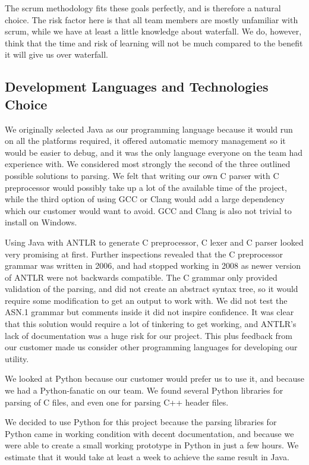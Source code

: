 The scrum methodology fits these goals perfectly, and is therefore a natural
choice. The risk factor here is that all team members are mostly unfamiliar
with scrum, while we have at least a little knowledge about waterfall. We do,
however, think that the time and risk of learning will not be much compared to
the benefit it will give us over waterfall.

\subsection{Development Languages and Technologies Choice}
We originally selected Java as our programming language because it would run on
all the platforms required, it offered automatic memory management so it would
be easier to debug, and it was the only language everyone on the team had
experience with. We considered most strongly the second of the three outlined
possible solutions to parsing. We felt that writing our own C parser with C
preprocessor would possibly take up a lot of the available time of the project,
while the third option of using GCC or Clang would add a large dependency which
our customer would want to avoid. GCC and Clang is also not trivial to install
on Windows.

Using Java with ANTLR to generate C preprocessor, C lexer and C parser looked
very promising at first. Further inspections revealed that the C preprocessor
grammar was written in 2006, and had stopped working in 2008 as newer version
of ANTLR were not backwards compatible. The C grammar only provided validation
of the parsing, and did not create an abstract syntax tree, so it would require
some modification to get an output to work with. We did not test the ASN.1
grammar but comments inside it did not inspire confidence. It was clear that
this solution would require a lot of tinkering to get working, and ANTLR’s lack
of documentation was a huge risk for our project. This plus feedback from our
customer made us consider other programming languages for developing our
utility.

We looked at Python because our customer would prefer us to use it, and because
we had a Python-fanatic on our team. We found several Python libraries for
parsing of C files, and even one for parsing C++ header files.

We decided to use Python for this project because the parsing libraries for
Python came in working condition with decent documentation, and because we
were able to create a small working prototype in Python in just a few hours.
We estimate that it would take at least a week to achieve the same result in
Java.

